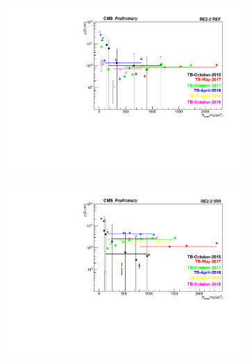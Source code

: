 	\begin{figure}[H]
    	\begin{subfigure}{0.5\linewidth}
			\centering
    		\includegraphics[width = \linewidth]{fig/chapt5/Resistivity-vs-Rate-BARC-8.pdf}
        	\caption{\label{fig:Resistivity-Fit:A}}
    	\end{subfigure}
    	\begin{subfigure}{0.5\linewidth}
			\centering
    		\includegraphics[width = \linewidth]{fig/chapt5/Resistivity-vs-Rate-BARC-9.pdf}
        	\caption{\label{fig:Resistivity-Fit:B}}
    	\end{subfigure}
    	\begin{subfigure}{0.5\linewidth}
			\centering

\end{subfigure}
\end{figure}
